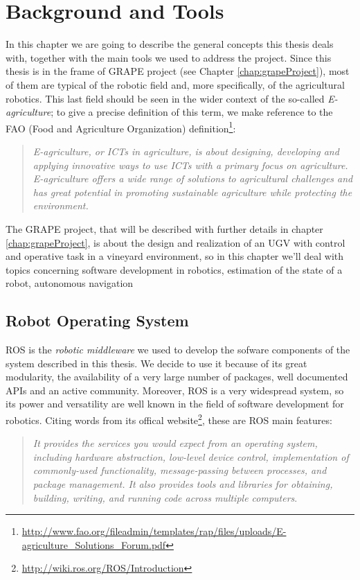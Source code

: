 
\chapter{Background and Tools} \label{chap:backgroundAndToolsChapter}

In this chapter we are going to describe the general concepts this thesis deals with, together with the main tools we used to address the project. Since this thesis is in the frame of \ac{GRAPE} project (see Chapter \ref{chap:grapeProject}),  most of them are typical of the robotic field and, more specifically, of the agricultural robotics. This last field should be seen in the wider context of the so-called \textit{E-agriculture}; to give a precise definition of this term, we make reference to the FAO (Food and Agriculture Organization) definition\footnote{\url{http://www.fao.org/fileadmin/templates/rap/files/uploads/E-agriculture\_Solutions\_Forum.pdf}}:
\blockquote{\textit{E-agriculture, or ICTs in agriculture, is about designing,
developing and applying innovative ways to use ICTs with a
primary focus on agriculture. E-agriculture offers a wide range
of solutions to agricultural challenges and has great potential
in promoting sustainable agriculture while protecting the
environment.}}
The \ac{GRAPE} project, that will be described with further details in chapter \ref{chap:grapeProject}, is about the design and realization of an \ac{UGV} with control and operative task in a vineyard environment, so in this chapter we'll deal with topics concerning software development in robotics, estimation of the state of a robot, autonomous navigation


\section{Robot Operating System}\label{sec:robotOperatingSystem}
\ac{ROS} is the \textit{robotic middleware} we used to develop the sofware components of the system described in this thesis. We decide to use it because of its great modularity, the availability of a very large number of packages, well documented APIs and an active community. Moreover, \ac{ROS} is a very widespread system, so its power and versatility are well known in the field of software development for robotics. Citing words from its offical website\footnote{\url{http://wiki.ros.org/ROS/Introduction}},
these are \ac{ROS} main features: 
\blockquote{
\textit{It provides the services you would expect from an operating system, including hardware abstraction, low-level device control, implementation of commonly-used functionality, message-passing between processes, and package management. It also provides tools and libraries for obtaining, building, writing, and running code across multiple computers}.
} 

